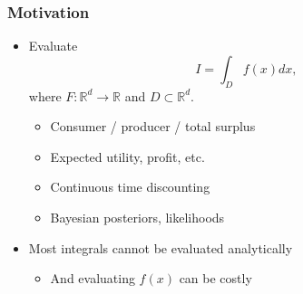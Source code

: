 \documentclass[bigger,handout]{beamer}
\newenvironment{stepitemize}{\begin{itemize}[<+->]}{\end{itemize} }
\begin{document}
\begin{frame}%
\frametitle{Motivation}

\begin{stepitemize}
\item Evaluate 
\begin{equation*}
I=\int_{D}f(x)dx,
\end{equation*}%
where $F:\mathbb{R}^{d}\rightarrow \mathbb{R}$ and $D\subset \mathbb{R}^{d}$.

\begin{stepitemize}
\item Consumer / producer / total surplus

\item Expected utility, profit, etc.

\item Continuous time discounting

\item Bayesian posteriors, likelihoods
\end{stepitemize}

\item Most integrals cannot be evaluated analytically

\begin{stepitemize}
\item And evaluating $f(x)$ can be costly
\end{stepitemize}
\end{stepitemize}

\end{frame}%
\end{document}
